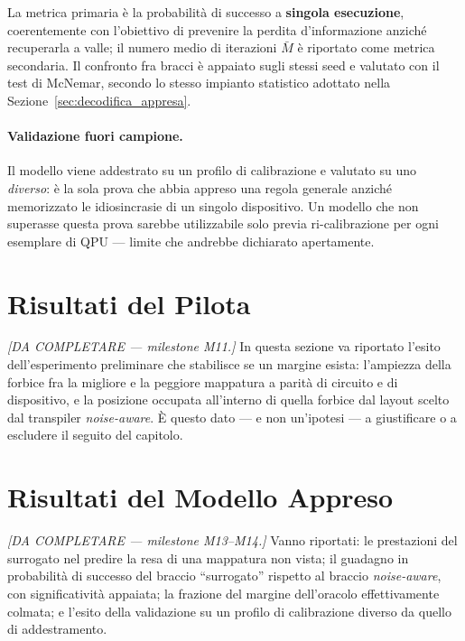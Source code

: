 \begin{onehalfspace}
La metrica primaria è la probabilità di successo a \textbf{singola esecuzione}, coerentemente con l'obiettivo di prevenire la perdita d'informazione anziché recuperarla a valle; il numero medio di iterazioni $\bar{M}$ è riportato come metrica secondaria. Il confronto fra bracci è appaiato sugli stessi seed e valutato con il test di McNemar, secondo lo stesso impianto statistico adottato nella Sezione~\ref{sec:decodifica_appresa}.

\paragraph{Validazione fuori campione.}
Il modello viene addestrato su un profilo di calibrazione e valutato su uno \emph{diverso}: è la sola prova che abbia appreso una regola generale anziché memorizzato le idiosincrasie di un singolo dispositivo. Un modello che non superasse questa prova sarebbe utilizzabile solo previa ri-calibrazione per ogni esemplare di QPU --- limite che andrebbe dichiarato apertamente.

\section{Risultati del Pilota}
\label{sec:risultati_pilota_layout}

\emph{[DA COMPLETARE --- milestone M11.]} In questa sezione va riportato l'esito dell'esperimento preliminare che stabilisce se un margine esista: l'ampiezza della forbice fra la migliore e la peggiore mappatura a parità di circuito e di dispositivo, e la posizione occupata all'interno di quella forbice dal layout scelto dal transpiler \textit{noise-aware}. È questo dato --- e non un'ipotesi --- a giustificare o a escludere il seguito del capitolo.

\section{Risultati del Modello Appreso}
\label{sec:risultati_surrogato}

\emph{[DA COMPLETARE --- milestone M13--M14.]} Vanno riportati: le prestazioni del surrogato nel predire la resa di una mappatura non vista; il guadagno in probabilità di successo del braccio ``surrogato'' rispetto al braccio \textit{noise-aware}, con significatività appaiata; la frazione del margine dell'oracolo effettivamente colmata; e l'esito della validazione su un profilo di calibrazione diverso da quello di addestramento.


\end{onehalfspace}
